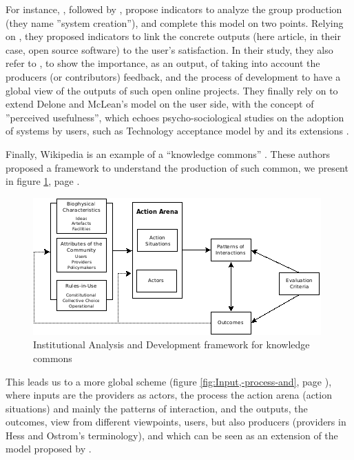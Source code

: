 For instance, \citet{CrowstonHowisonAnnabi06}, followed by \citet{LeeKimGupta09},
propose indicators to analyze the group production (they name ''system
creation''), and complete this model on two points. Relying on \citet{DeLoneMcLean92,DeLoneMcLean02,DeLoneMcLean03},
they proposed indicators to link the concrete outputs (here article,
in their case, open source software) to the user's satisfaction. In
their study, they also refer to \citet{Hackman87}, to show the importance,
as an output, of taking into account the producers (or contributors)
feedback, and the process of development to have a global view of
the outputs of such open online projects. They finally rely on \citet{Seddon97}
to extend Delone and McLean's model on the user side, with the concept
of ''perceived usefulness'', which echoes psycho-sociological studies
on the adoption of systems by users, such as Technology acceptance
model by \citet{Davis89} and its extensions \citep{Venkateshetal03}. 

Finally, Wikipedia is an example of a ``knowledge commons'' \citep{HessOstrom06b}.
These authors proposed a framework to understand the production of
such common, we present in figure \ref{fig:Institutional-Analysis-and},
page \pageref{fig:Institutional-Analysis-and}.

\begin{figure}
\caption{\label{fig:Institutional-Analysis-and}Institutional
Analysis and Development framework for knowledge commons \citep[p. 44]{OstromHess06}}
\includegraphics{Institutional_Analysis_and_Developement_framework_Hess-Ostrom}
\end{figure}

This leads us to a more global scheme (figure \ref{fig:Input,-process-and},
page \pageref{fig:Input,-process-and}), where inputs are the providers
as actors, the process the action arena (action situations) and mainly
the patterns of interaction, and the outputs, the outcomes, view from
different viewpoints, users, but also producers (providers in Hess
and Ostrom's terminology), and which can be seen as an extension of
the model proposed by \citet[p. 720]{ZhaoBishop11}. 

